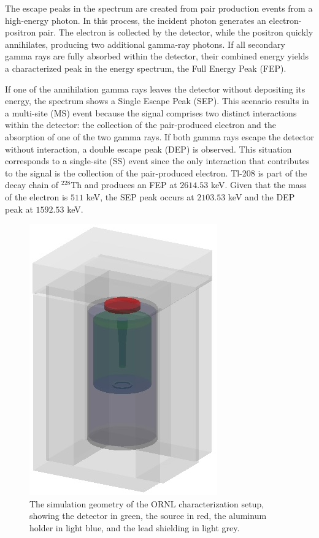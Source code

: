 The escape peaks in the spectrum are created from pair production events from a high-energy photon. In this process, the incident photon generates an electron-positron pair. The electron is collected by the detector, while the positron quickly annihilates, producing two additional gamma-ray photons. If all secondary gamma rays are fully absorbed within the detector, their combined energy yields a characterized peak in the energy spectrum, the Full Energy Peak (FEP).


If one of the annihilation gamma rays leaves the detector without depositing its energy, the spectrum shows a Single Escape Peak (SEP). This scenario results in a multi-site (MS) event because the signal comprises two distinct interactions within the detector: the collection of the pair-produced electron and the absorption of one of the two gamma rays. If both gamma rays escape the detector without interaction, a double escape peak (DEP) is observed. This situation corresponds to a single-site (SS) event since the only interaction that contributes to the signal is the collection of the pair-produced electron. Tl-208 is part of the decay chain of $^{228}$Th and produces an FEP at $2614.53$ keV. Given that the mass of the electron is $511$ keV, the SEP peak occurs at $2103.53$ keV and the DEP peak at $1592.53$ keV. 


\begin{figure}%
    \centering
    \includegraphics[width=0.4\linewidth]{ch7/figs/shielding.jpeg}
    \caption{The simulation geometry of the ORNL characterization setup, showing the detector in green, the source in red, the aluminum holder in light blue, and the lead shielding in light grey.}
   \label{ch7_fig_g4simple_setup}
\end{figure}


